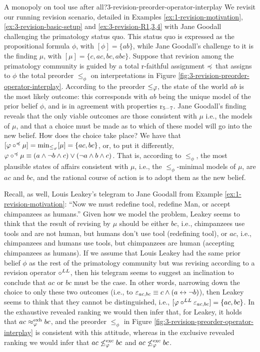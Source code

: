 \begin{xmpl}{A monopoly on tool use after all?}{3-revision-preorder-operator-interplay}
	We revisit our running revision scenario,
	detailed in 
	Examples \ref{ex:1-revision-motivation}, 
	\ref{ex:3-revision-basic-setup} and \ref{ex:3-revision-R1,3,4}
	with Jane Goodall challenging the primatology status quo.
	This status quo is
	expressed as the propositional formula $\phi$,
	with $[\phi]=\{ab\}$,
	while Jane Goodall's challenge to it
	is the finding $\mu$, with $[\mu]=\{c,ac,bc,abc\}$.
	Suppose that revision among the primatology community 
	is guided by a total r-faithful assignment $\as$
	that assigns to $\phi$ the
	total preorder $\le_\phi$ on interpretations 
	in Figure \ref{fig:3-revision-preorder-operator-interplay}.
	According to the preorder $\le_{\P}$, the state of the world 
	$ab$ is the most likely outcome: this corresponds
	with $ab$ being the unique model of the prior belief $\phi$,
	and is in agreement with properties $\oor{5-7}$.
	Jane Goodall's finding reveals that the only 
	viable outcomes are those consistent with $\mu$
	i.e., the models of $\mu$,
	and that a choice must be made as to which of these model
	will go into the new belief.
	How does the choice take place?
	We have that 
	$[\phi\re^\as\mu] = \min_{\le_\phi}[\mu] = \{ac,bc\}$,
	or, to put it differently,
	$\phi\re^\as\mu\equiv (a\land\lnot b\land c)\lor (\lnot a\land b\land c)$.
	That is, according to $\le_\phi$, the most plausible 
	states of affairs consistent with $\mu$, 
	i.e., the $\le_\phi$-minimal models of $\mu$,
	are $ac$ and $bc$,
	and the rational course of action is to adopt 
	them as the new belief.

	Recall, as well, Louis Leakey's telegram to Jane Goodall
	from Example \ref{ex:1-revision-motivation}:
	``Now we must redefine tool, redefine Man, or accept chimpanzees as humans.''
	Given how we model the problem, 
	Leakey seems to think that the result of revising by $\mu$
	should be either $bc$, 
	i.e., chimpanzees use tools and are not human, 
	but humans don't use tool (redefining tool),
	or $ac$, i.e., chimpanzees and humans use tools, 
	but chimpanzees are human (accepting chimpanzees as humans).
	If we assume that Louis Leakey had the same prior belief $\phi$
	as the rest of the primatology community
	but was revising according to a revision operator $\re^{LL}$,
	then his telegram seems to suggest an inclination to 
	conclude that $ac$ or $bc$ must be the case.
	In other words, narrowing down the choice to only these two outcomes 
	(i.e., to $\px_{ac,bc}\equiv c \land (a\leftrightarrow\lnot b)$),
	then Leakey seems to think that they cannot be distinguished,
	i.e., $[\phi\re^{LL}\px_{ac,bc}]=\{ac,bc\}$.
	In the exhaustive revealed ranking we would then infer 
	that, for Leakey, it holds that $ac\approx^\exh_\phi bc$,
	and the preorder $\le_\phi$ 
	in Figure \ref{fig:3-revision-preorder-operator-interplay}
	is consistent with this attitude,
	whereas in the exclusive revealed ranking we 
	would infer that $ac\not\le^\exc_\phi bc$ 
	and $ac\not\le^\exc_\phi bc$. 
\end{xmpl}

